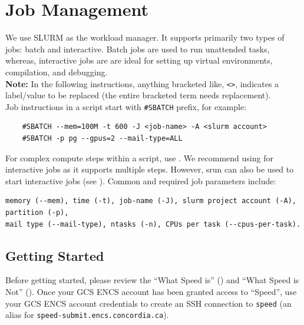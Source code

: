 \documentclass{easychair}
\begin{document}
\section{Job Management}
\label{sect:job-management}

We use SLURM as the workload manager. It supports primarily two types of jobs: batch and interactive.
Batch jobs are used to run unattended tasks, whereas, 
interactive jobs are are ideal for setting up virtual environments, compilation, and debugging.\\

\noindent \textbf{Note:} In the following instructions, anything bracketed like, \verb+<>+, indicates a
label/value to be replaced (the entire bracketed term needs replacement).\\

\noindent Job instructions in a script start with \verb+#SBATCH+ prefix, for example:
\begin{verbatim}
    #SBATCH --mem=100M -t 600 -J <job-name> -A <slurm account>
    #SBATCH -p pg --gpus=2 --mail-type=ALL
\end{verbatim}
%
For complex compute steps within a script, use . We recommend using  for interactive jobs as it supports multiple steps.
However, srun can also be used to start interactive jobs (see ).
%
Common and required job parameters include:
\begin{verbatim}
memory (--mem), time (-t), job-name (-J), slurm project account (-A), partition (-p), 
mail type (--mail-type), ntasks (-n), CPUs per task (--cpus-per-task).
\end{verbatim}

\subsection{Getting Started}
\label{sect:getting-started}

Before getting started, please review the ``What Speed is'' ()
and ``What Speed is Not'' ().
Once your GCS ENCS account has been granted access to ``Speed'',
use your GCS ENCS account credentials to create an SSH connection to 
\texttt{speed} (an alias for \texttt{speed-submit.encs.concordia.ca}).\\
\end{document}
